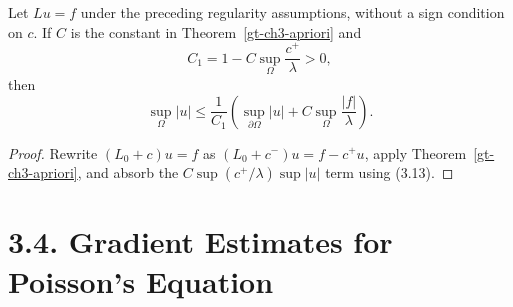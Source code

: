 \begin{corollary}\label{gt-ch3-grad-cor}
Let $Lu=f$ under the preceding regularity assumptions, without a sign
condition on $c$. If $C$ is the constant in Theorem~\ref{gt-ch3-apriori} and
\begin{equation}
\tag{3.13}
C_1=1-C\sup_\Omega\frac{c^+}{\lambda}>0,
\end{equation}
then
\begin{equation}
\tag{3.14}
\sup_\Omega|u|\leq\frac1{C_1}
\left(\sup_{\partial\Omega}|u|+C\sup_\Omega\frac{|f|}{\lambda}\right).
\end{equation}
\end{corollary}
\begin{proof}
\sketch Rewrite $(L_0+c)u=f$ as
$(L_0+c^-)u=f-c^+u$, apply Theorem~\ref{gt-ch3-apriori}, and absorb the
$C\sup(c^+/\lambda)\sup|u|$ term using (3.13).
\end{proof}

\section*{3.4. Gradient Estimates for Poisson's Equation}

